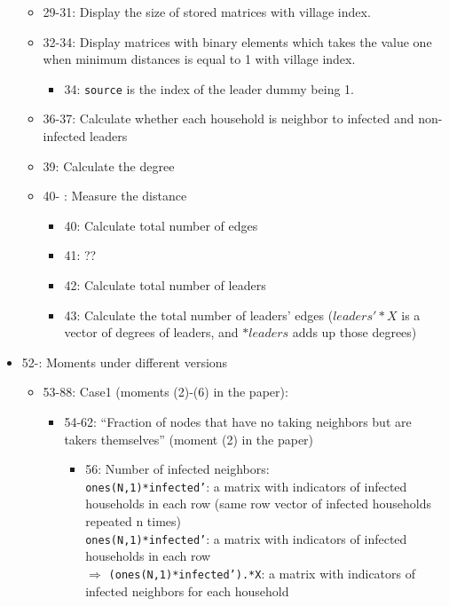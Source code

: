 \documentclass[10pt,letterpaper]{article}
\begin{document}
\begin{itemize}
\begin{itemize}
      \item 29-31: Display the size of stored matrices with village index.
      \item 32-34: Display matrices with binary elements which takes the value one when minimum distances is equal to 1 with village index.
        \begin{itemize}
      		\item 34: \texttt{source} is the index of the leader dummy being 1. 
        \end{itemize}
      \item 36-37: Calculate whether each household is neighbor to infected and non-infected leaders
      \item 39: Calculate the degree
      \item 40- : Measure the distance 
        \begin{itemize}
          \item 40: Calculate total number of edges
          \item 41: ??
          \item 42: Calculate total number of leaders
          \item 43: Calculate the total number of leaders' edges ($leaders'*X$ is a vector of degrees of leaders, and $*leaders$ adds up those degrees)
        \end{itemize}
    \end{itemize}
  \item 52-: Moments under different versions
    \begin{itemize}
      \item 53-88: Case1 (moments (2)-(6) in the paper):
        \begin{itemize}
          \item 54-62: ``Fraction of nodes that have no taking neighbors but are takers themselves'' (moment (2) in the paper)
            \begin{itemize}
              \item 56: Number of infected neighbors: \\
                \texttt{ones(N,1)*infected'}: a matrix with indicators of infected households in each row (same row vector of infected households repeated n times)\\
                \texttt{ones(N,1)*infected'}: a matrix with indicators of infected households in each row \\
                $\Rightarrow$ \texttt{(ones(N,1)*infected').*X}: a matrix with indicators of infected neighbors for each household \\

\end{itemize}
\end{itemize}
\end{itemize}
\end{itemize}
\end{document}
